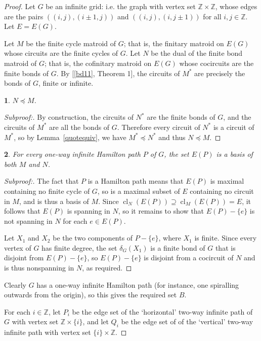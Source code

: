 \documentclass{amsart}
\theoremstyle{plain}
\newtheorem{claim}{}[theorem]
\theoremstyle{definition}
\newcommand{\bZ}{\mathbb Z}
\DeclareMathOperator{\cl}{cl}
\newenvironment{subproof}[1][\proofname]{%
  \renewcommand{\qedsymbol}{$\blacksquare$}%
  \begin{proof}[Subproof:]%
}{%
  \end{proof}%
}
\begin{document}
\begin{proof}
  Let $G$ be an infinite grid: i.e. the graph with vertex set $\bZ \times \bZ$, 
  whose edges are the pairs $((i,j), (i \pm 1, j))$ and $((i,j), (i, j \pm 1))$ for all $i, j \in \bZ$. 
  Let $E = E(G)$. 

  Let $M$ be the finite cycle matroid of $G$; that is, the finitary matroid on $E(G)$ whose circuits are the finite cycles of $G$. 
  Let $N$ be the dual of the finite bond matroid of $G$; that is, the cofinitary matroid on $E(G)$ whose cocircuits are the finite bonds of $G$. 
  By [\ref{bd11}, Theorem 1], the circuits of $M^*$ are precisely the bonds of $G$, finite or infinite. 
  
  \begin{claim}
    $N \preceq M$. 
  \end{claim}
  \begin{subproof}
    By construction, the circuits of $N^*$ are the finite bonds of $G$, and the circuits of $M^*$ are all the bonds of $G$. 
    Therefore every circuit of $N^*$ is a circuit of $M^*$, so by Lemma~\ref{quotequiv}, we have $M^* \preceq N^*$ and thus $N \preceq M$. 
  \end{subproof}

  \begin{claim}
    For every one-way infinite Hamilton path $P$ of $G$, the set $E(P)$ is a basis of both $M$ and $N$. 
  \end{claim}
  \begin{subproof}
    The fact that $P$ is a Hamilton path means that $E(P)$ is maximal containing no finite cycle of $G$,
    so is a maximal subset of $E$ containing no circuit in $M$, and is thus a basis of $M$. 
    Since $\cl_N(E(P)) \supseteq \cl_M(E(P)) = E$, it follows that $E(P)$ is spanning in $N$, 
    so it remains to show that $E(P) - \{e\}$ is not spanning in $N$ for each $e \in E(P)$. 

    Let $X_1$ and $X_2$ be the two components of $P - \{e\}$, where $X_1$ is finite. Since every vertex of $G$ has finite 
    degree, the set $\delta_G(X_1)$ is a finite bond of $G$ that is disjoint from $E(P) - \{e\}$,
    so $E(P) - \{e\}$ is disjoint from a cocircuit of $N$ 
    and is thus nonspanning in $N$, as required. 
  \end{subproof}

  Clearly $G$ has a one-way infinite Hamilton path (for instance, one spiralling outwards from the origin), 
  so this gives the required set $B$. 

  For each $i \in \bZ$, let $P_i$ be the edge set of the 
  `horizontal' two-way infinite path of $G$ with vertex set $\bZ \times \{i\}$, 
  and let $Q_i$ be the edge set of of the `vertical' two-way infinite path 
  with vertex set $\{i\} \times \bZ$. 


\end{proof}
\end{document}
